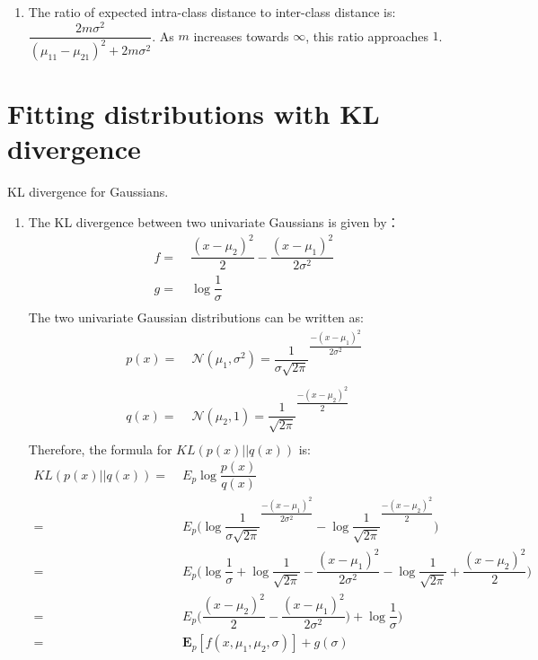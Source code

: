 \documentclass[english]{article}
\begin{document}
\begin{enumerate}
\begin{enumerate}
\item The ratio of expected intra-class distance to inter-class
  distance is: $\dfrac{2m\sigma^2}{(\mu_{11} - \mu_{21})^2 + 2m\sigma^2}$.  As $m$ increases towards $\infty$, this
  ratio approaches $1$.
\end{enumerate}

\end{enumerate}

\section{Fitting distributions with KL divergence}

KL divergence for Gaussians.
  \begin{enumerate}
  \item The KL divergence between two univariate Gaussians is given by：
  \begin{align*}
    f =&\; \dfrac{(x - \mu_{2})^2}{2}  - \dfrac{(x - \mu_{1})^2}{2\sigma^2} \\
    g =&\; \log \dfrac{1}{\sigma} \\
  \end{align*}
  The two univariate Gaussian distributions can be written as: \\
  \begin{align*}
    p(x) = &\; \mathcal{N}(\mu_{1}, \sigma^2) = \dfrac{1}{\sigma \sqrt{2\pi}}^\dfrac{-(x - \mu_{1})^2}{2\sigma^2} \\ \\
    q(x) = &\; \mathcal{N}(\mu_{2}, 1) = \dfrac{1}{\sqrt{2\pi}}^\dfrac{-(x - \mu_{2})^2}{2}\\
  \end{align*}
  Therefore, the formula for $KL(p(x) || q(x))$ is:
  \begin{align*}
    KL(p(x) || q(x)) =&\; E_p \log \dfrac{p(x)}{q(x)} \\
    =&\; E_p\bigg( \log \dfrac{1}{\sigma \sqrt{2\pi}}^\dfrac{-(x - \mu_{1})^2}{2\sigma^2} - \log \dfrac{1}{\sqrt{2\pi}}^\dfrac{-(x - \mu_{2})^2}{2} \bigg) \\
    =&\; E_p \bigg( \log \dfrac{1}{\sigma} + \log \dfrac{1}{\sqrt{2\pi}} - \dfrac{(x - \mu_{1})^2}{2\sigma^2} - \log \dfrac{1}{\sqrt{2\pi}} + \dfrac{(x - \mu_{2})^2}{2} \bigg) \\
    =&\; E_p\bigg( \dfrac{(x - \mu_{2})^2}{2} - \dfrac{(x - \mu_{1})^2}{2\sigma^2} \bigg) + \log \dfrac{1}{\sigma} \bigg) \\
    =&\; \mathbf{E}_p[ f(x, \mu_1, \mu_2, \sigma)] + g(\sigma)
  \end{align*}


\end{enumerate}
\end{document}
